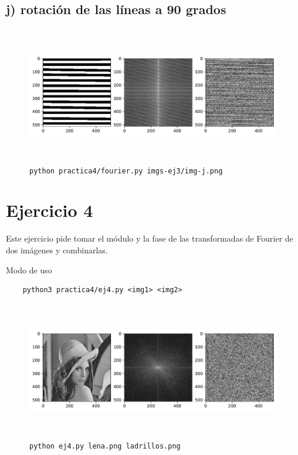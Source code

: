 \documentclass[11pt, spanish]{article}
\begin{document}
\subsection{j) rotación de las líneas a 90 grados}
\begin{figure}[H]
\centering
  \includegraphics[height=6cm]{informe-imgs/ej3-j.pdf}
  \caption{\texttt{python practica4/fourier.py imgs-ej3/img-j.png}}
\end{figure}

\newpage
\section{Ejercicio 4}

Este ejercicio pide tomar el módulo y la fase de las transformadas de Fourier de dos imágenes y combinarlas.

Modo de uso
\begin{verbatim}
    python3 practica4/ej4.py <img1> <img2>
\end{verbatim}

\begin{figure}[H]
\centering
  \includegraphics[height=6cm]{informe-imgs/ej4-lena.pdf}
  \caption{\texttt{python ej4.py lena.png ladrillos.png}}
\end{figure}
\end{document}
